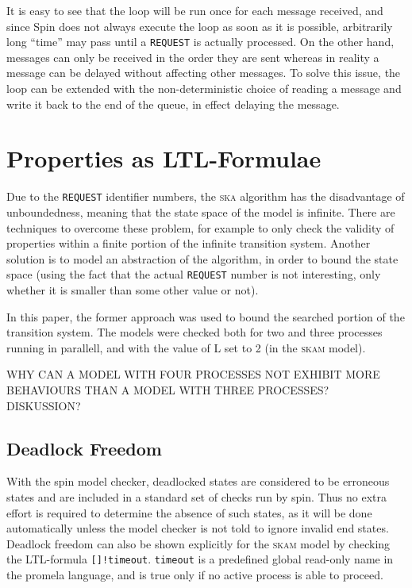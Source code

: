 \documentclass[a4paper,10pt]{llncs}
\begin{document}
It is easy to see that the loop will be run once for each message received, and since Spin does not always execute the loop as soon as it is possible, arbitrarily long ``time'' may pass until a \texttt{REQUEST} is actually processed. On the other hand, messages can only be received in the order they are sent whereas in reality a message can be delayed without affecting other messages. To solve this issue, the loop can be extended with the non-deterministic choice of reading a message and write it back to the end of the queue, in effect delaying the message.


\section{Properties as LTL-Formulae}
Due to the \texttt{REQUEST} identifier numbers, the \textsc{ska} algorithm has the disadvantage of unboundedness, meaning that the state space of the model is infinite. There are techniques to overcome these problem, for example to only check the validity of properties within a finite portion of the infinite transition system. Another solution is to model an abstraction of the algorithm, in order to bound the state space (using the fact that the actual \texttt{REQUEST} number is not interesting, only whether it is smaller than some other value or not).

In this paper, the former approach was used to bound the searched portion of the transition system. The models were checked both for two and three processes running in parallell, and with the value of L set to 2 (in the \textsc{skam} model).

WHY CAN A MODEL WITH FOUR PROCESSES NOT EXHIBIT MORE BEHAVIOURS THAN A MODEL WITH THREE PROCESSES? DISKUSSION?

\subsection{Deadlock Freedom}
With the spin model checker, deadlocked states are considered to be erroneous states and are included in a standard set of checks run by spin. Thus no extra effort is required to determine the absence of such states, as it will be done automatically unless the model checker is not told to ignore invalid end states. Deadlock freedom can also be shown explicitly for the \textsc{skam} model by checking the LTL-formula \texttt{[]!timeout}. \texttt{timeout} is a predefined global read-only name in the promela language, and is true only if no active process is able to proceed.
\end{document}
